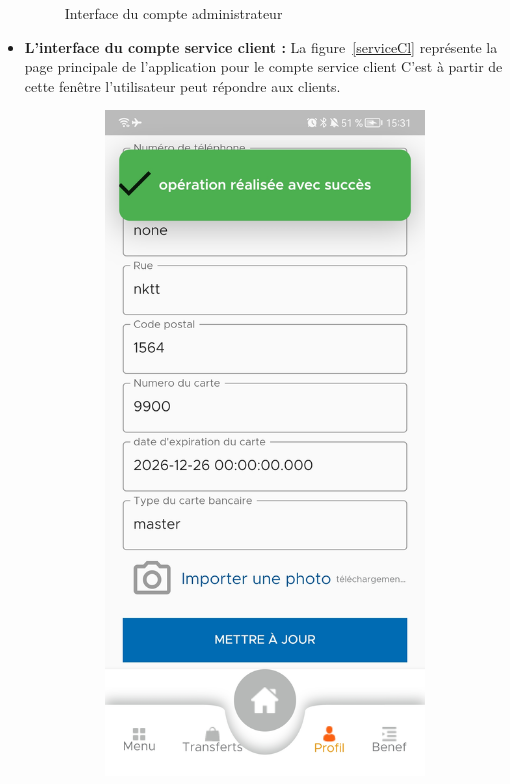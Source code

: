 \begin{itemize}[label=$\ast$]
\begin{figure}
	\caption{Interface du compte administrateur
}
\label{Home}
\end{figure}
\newpage
\item \textbf{L’interface du compte service client
	:} 
La figure~\ref{serviceCl} représente la page principale de l’application pour le compte service client C’est à partir de cette fenêtre l'utilisateur peut répondre aux clients.
\begin{figure}
	\centering
\begin{subfigure}{0.3\textwidth}
	\includegraphics[width=\hsize, valign=m ]{./Template LaTeX/Images/9.jpg}

\end{subfigure}
\end{figure}
\end{itemize}
